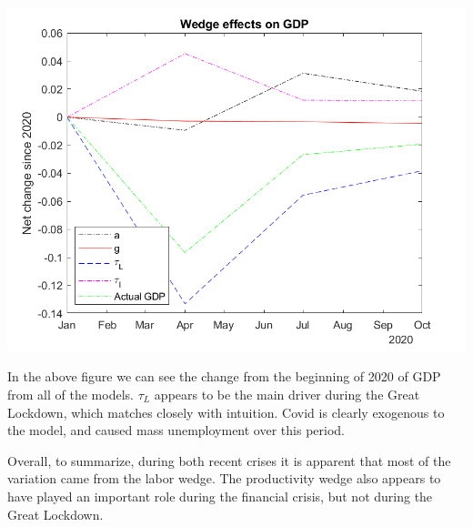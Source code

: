 \documentclass[11pt]{article} %
\begin{document}
\includegraphics{wedgescovdiff}

In the above figure we can see the change from the beginning of 2020 of GDP from all of the models. $\tau_L$ appears to be the main driver during the Great Lockdown, which matches closely with intuition. Covid is clearly exogenous to the model, and caused mass unemployment over this period.

Overall, to summarize, during both recent crises it is apparent that most of the variation came from the labor wedge. The productivity wedge also appears to have played an important role during the financial crisis, but not during the Great Lockdown. 

\end{document}
